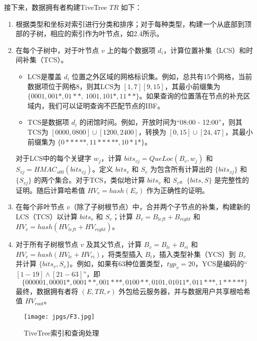\documentclass{cumcmthesis}
\numberwithin{equation}{section} %
\numberwithin{figure}{section} %
\numberwithin{table}{section} %
\begin{document}
接下来，数据拥有者构建TiveTree $TR$ 如下：
\begin{enumerate}
    \item 根据类型和坐标对索引进行分类和排序；对于每种类型，构建一个从底部到顶部的子树，相应的索引作为叶节点，如2.4所示。
    \item 在每个子树中，对于叶节点 $v$ 上的每个数据项 $d_i$，计算位置补集（LCS）和时间补集（TCS）。
        \begin{itemize}
            \item LCS是覆盖 $d_i$ 位置之外区域的网格标识集。例如，总共有15个网格，当前数据项位于网格8，则其LCS为 $[1, 7][9, 15]$，其最小前缀集为 $\{0001, 001*, 01**,\ 1001, 101*, 11 **\}$。如果查询的位置落在节点的补充区域内，我们可以证明查询不匹配节点的IBF。
            \item TCS是数据项 $d_i$ 的闭馆时间。例如，开放时间为“08:00 - 12:00”，则其TCS为 $[0000, 0800] \cup [1200, 2400]$，转换为 $[0, 15] \cup [24, 47]$，其最小前缀集为 $\{0 *****, 11 *****, 10 * 1 *\}$。
        \end{itemize}
        对于LCS中的每个关键字 $w_j$，计算 $bits_{vj} = QueLoc(B_v, w_j)$ 和 $S_{vj} = HMAC_{sk0}(bits_{vj})$。定义 $bits_v$ 和 $S_v$ 为包含所有计算出的 $\{bits_{vj}\}$ 和 $\{S_{vj}\}$ 的两个集合。对于TCS，类似地计算 $bits_v$ 和 $S_v$。$\{bits, S\}$ 是完整性的证明。随后计算哈希值 $HV_v = hash(E_v)$ 作为正确性的证明。
    \item 在每个非叶节点 $v$（除了子树根节点）中，合并两个子节点的补集，构建新的LCS（TCS）以计算 $bits_v$ 和 $S_v$；计算 $B_v = B_{left} + B_{right}$ 和 $HV_v = hash(HV_{left} + HV_{right})$。
    \item 对于所有子树根节点 $v$ 及其父节点，计算 $B_v = B_{le} + B_{ri}$ 和 $HV_v = hash(HV_{le} + HV_{ri})$，将类型插入 $B_i$，插入类型补集（YCS）到 $B_v$ 并计算 $\{bits_v, S_v\}$。例如，如果有63种位置类型，$typ_v = 20$，YCS是编码的“$[1 - 19]\land[21 - 63]$”，即
        \[\{000001, 00001 *, 0001 * *, 001 * * *, 0100 * *, 0101, 01011 *, 011 * * *, 1 * * * * *\}\]
最终，数据拥有者将 $(E, TR, r)$ 外包给云服务器，并与数据用户共享根哈希值 $HV_{root}$。
\end{enumerate}

\begin{figure}[H]
    \centering
    \texttt{[image: jpgs/F3.jpg]}
    \caption{TiveTree索引和查询处理}
    \label{fig:tivetree_index_query}
\end{figure}
\end{document}
